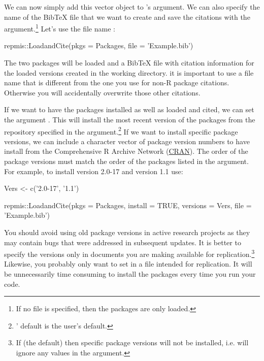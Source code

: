 \noindent We can now simply add this vector object to 's  argument. We can also specify the name of the BibTeX file that we want to create and save the citations with the  argument.\footnote{If no file is specified, then the packages are only loaded.} Let's use the file name :

\begin{example}
  repmis::LoadandCite(pkgs = Packages, file = 'Example.bib')
\end{example}

\noindent The two packages will be loaded and a BibTeX file with citation information for the loaded versions created in the working directory.  it is important to use a file name that is different from the one you use for non-R package citations. Otherwise you will accidentally overwrite those other citations.

If we want to have the packages installed as well as loaded and cited, we can set the argument . This will install the most recent version of the packages from the repository specified in the  argument.\footnote{' default is the user's default.} If we want to install specific package versions, we can include a character vector of package version numbers to have  install from the Comprehensive R Archive Network (\href{http://cran.r-project.org/}{CRAN}). The order of the package versions must match the order of the packages listed in the  argument. For example, to install  version 2.0-17 and  version 1.1 use:

\begin{example}
  Vers <- c('2.0-17', '1.1')

  repmis::LoadandCite(pkgs = Packages, install = TRUE,
                      versions = Vers, file = 'Example.bib')
\end{example}


\noindent You should avoid using old package versions in active research projects as they may contain bugs that were addressed in subsequent updates. It is better to specify the versions only in documents you are making available for replication.\footnote{If  (the default) then specific package versions will not be installed, i.e.  will ignore any values in the  argument.} Likewise, you probably only want to set  in a file intended for replication. It will be unnecessarily time consuming to install the packages every time you run your code.

